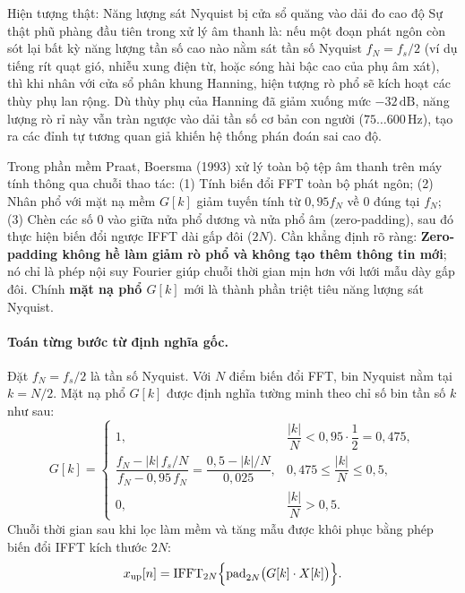 \begin{firstprin}{Hiện tượng thật: Năng lượng sát Nyquist bị cửa sổ quăng vào dải đo cao độ}
Sự thật phũ phàng đầu tiên trong xử lý âm thanh là: nếu một đoạn phát ngôn còn sót lại bất kỳ năng lượng tần số cao nào nằm sát tần số Nyquist $f_N = f_s/2$ (ví dụ tiếng rít quạt gió, nhiễu xung điện từ, hoặc sóng hài bậc cao của phụ âm xát), thì khi nhân với cửa sổ phân khung Hanning, hiện tượng rò phổ sẽ kích hoạt các thùy phụ lan rộng. Dù thùy phụ của Hanning đã giảm xuống mức $-32\,\text{dB}$, năng lượng rò rỉ này vẫn tràn ngược vào dải tần số cơ bản con người ($75 \ldots 600\,\text{Hz}$), tạo ra các đỉnh tự tương quan giả khiến hệ thống phán đoán sai cao độ.

Trong phần mềm Praat, Boersma (1993) xử lý toàn bộ tệp âm thanh trên máy tính thông qua chuỗi thao tác: (1) Tính biến đổi FFT toàn bộ phát ngôn; (2) Nhân phổ với mặt nạ mềm $G[k]$ giảm tuyến tính từ $0{,}95 f_N$ về $0$ đúng tại $f_N$; (3) Chèn các số 0 vào giữa nửa phổ dương và nửa phổ âm (zero-padding), sau đó thực hiện biến đổi ngược IFFT dài gấp đôi ($2N$). Cần khẳng định rõ ràng: \textbf{Zero-padding không hề làm giảm rò phổ và không tạo thêm thông tin mới}; nó chỉ là phép nội suy Fourier giúp chuỗi thời gian mịn hơn với lưới mẫu dày gấp đôi. Chính \textbf{mặt nạ phổ $G[k]$} mới là thành phần triệt tiêu năng lượng sát Nyquist.
\end{firstprin}

\paragraph{Toán từng bước từ định nghĩa gốc.}
Đặt $f_N = f_s/2$ là tần số Nyquist. Với $N$ điểm biến đổi FFT, bin Nyquist nằm tại $k = N/2$. Mặt nạ phổ $G[k]$ được định nghĩa tường minh theo chỉ số bin tần số $k$ như sau:
\[
G[k] =
\begin{cases}
1, & \dfrac{|k|}{N} < 0{,}95 \cdot \dfrac{1}{2} = 0{,}475,\\[8pt]
\dfrac{f_N - |k|\,f_s/N}{f_N - 0{,}95\,f_N} = \dfrac{0{,}5 - |k|/N}{0{,}025}, & 0{,}475 \le \dfrac{|k|}{N} \le 0{,}5,\\[8pt]
0, & \dfrac{|k|}{N} > 0{,}5.
\end{cases}
\]
Chuỗi thời gian sau khi lọc làm mềm và tăng mẫu được khôi phục bằng phép biến đổi IFFT kích thước $2N$:
\[
x_{\mathrm{up}}[n] = \mathrm{IFFT}_{2N}\Bigl\{\mathrm{pad}_{2N}\bigl(G[k] \cdot X[k]\bigr)\Bigr\}.
\]

